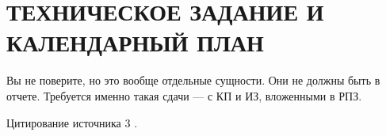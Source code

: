\section{ТЕХНИЧЕСКОЕ ЗАДАНИЕ И КАЛЕНДАРНЫЙ ПЛАН}

Вы не поверите, но это вообще отдельные сущности. Они не должны быть
в отчете. Требуется именно такая сдачи --- с КП и ИЗ, вложенными в РПЗ.

\lipsum[1-2]

Цитирование источника 3 \cite{Wikipedia3}.
